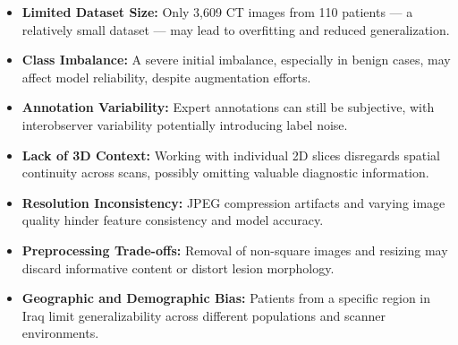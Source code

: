 \begin{itemize}
    \item \textbf{Limited Dataset Size:} Only 3,609 CT images from 110 patients — a relatively
    small dataset — may lead to overfitting and reduced generalization.

    \item \textbf{Class Imbalance:} A severe initial imbalance, especially in benign cases, may 
    affect model reliability, despite augmentation efforts.

    \item \textbf{Annotation Variability:} Expert annotations can still be subjective, with 
    interobserver variability potentially introducing label noise.

    \item \textbf{Lack of 3D Context:} Working with individual 2D slices disregards spatial 
    continuity across scans, possibly omitting valuable diagnostic information.

    \item \textbf{Resolution Inconsistency:} JPEG compression artifacts and varying image quality
    hinder feature consistency and model accuracy.

    \item \textbf{Preprocessing Trade-offs:} Removal of non-square images and resizing may discard
    informative content or distort lesion morphology.

    \item \textbf{Geographic and Demographic Bias:} Patients from a specific region in Iraq limit 
    generalizability across different populations and scanner environments.
\end{itemize}
